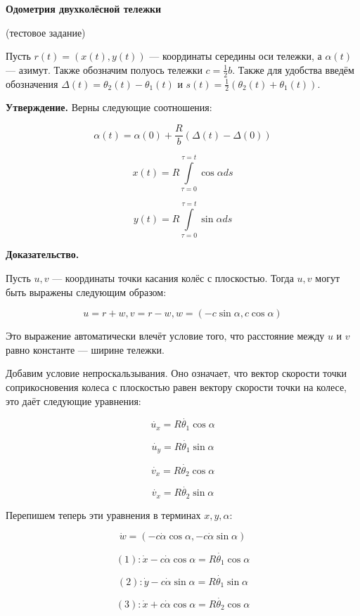 \documentclass[12pt,a4paper]{article}
\begin{document}
\begin{center}
{\huge \bfseries Одометрия двухколёсной тележки}

(тестовое задание)
\end{center}

Пусть $r(t) = (x(t), y(t))$ --- координаты середины оси тележки, а $\alpha(t)$ --- азимут. Также обозначим полуось тележки $c = \frac{1}{2}b$. Также для удобства введём обозначения $\Delta(t) = \theta_2(t) - \theta_1(t)$ и $s(t) = \frac{1}{2}(\theta_2(t) + \theta_1(t))$.

{\bfseries Утверждение.} Верны следующие соотношения:

$$
\alpha(t) = \alpha(0) + \frac{R}{b} \left( \Delta(t) - \Delta(0) \right)
$$

$$
x(t) = R\int\limits_{\tau = 0}^{\tau = t} \cos{\alpha}ds
$$

$$
y(t) = R\int\limits_{\tau = 0}^{\tau = t} \sin{\alpha}ds
$$

{\bfseries Доказательство.}

Пусть $u, v$ --- координаты точки касания колёс с плоскостью. Тогда $u, v$ могут быть выражены следующим образом:

$$
u = r + w, v = r - w, w = (- c \sin{\alpha}, c \cos{\alpha})
$$

Это выражение автоматически влечёт условие того, что расстояние между $u$ и $v$ равно константе --- ширине тележки.

Добавим условие непроскальзывания. Оно означает, что вектор скорости точки соприкосновения колеса с плоскостью равен вектору скорости точки на колесе, это даёт следующие уравнения:

$$
\dot{u_x} = R\dot{\theta_1}\cos{\alpha}
$$

$$
\dot{u_y} = R\dot{\theta_1}\sin{\alpha}
$$

$$
\dot{v_x} = R\dot{\theta_2}\cos{\alpha}
$$

$$
\dot{v_x} = R\dot{\theta_2}\sin{\alpha}
$$

\noindent Перепишем теперь эти уравнения в терминах $x, y, \alpha$:

$$
\dot{w} = (-c \dot{\alpha}\cos{\alpha}, -c \dot{\alpha}\sin{\alpha})
$$

$$
(1): \dot{x} - c \dot{\alpha}\cos{\alpha} = R\dot{\theta_1}\cos{\alpha}
$$

$$
(2): \dot{y} - c \dot{\alpha}\sin{\alpha} = R\dot{\theta_1}\sin{\alpha}
$$

$$
(3): \dot{x} + c \dot{\alpha}\cos{\alpha} = R\dot{\theta_2}\cos{\alpha}
$$
\end{document}
